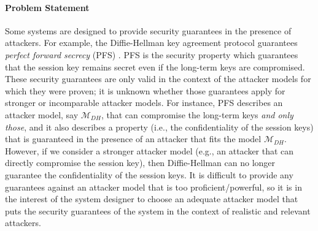     



\label{sec:Classification:ClassificationProblem}
\paragraph{Problem Statement}
Some systems are designed to provide security guarantees in the presence of attackers. For example, the Diffie-Hellman key agreement protocol guarantees \emph{perfect forward secrecy} (PFS) \cite{Gunther1990,Menezes1996}. PFS is the security property which guarantees that the session key remains secret even if the long-term keys are compromised. These security guarantees are only valid in the context of the attacker models for which they were proven; it is unknown whether those guarantees apply for stronger or incomparable attacker models. For instance, PFS describes an attacker model, say $\mathcal{M}_{DH}$, that can compromise the long-term keys \emph{and only those}, and it also describes a property (i.e., the confidentiality of the session keys) that is guaranteed in the presence of an attacker that fits the model $\mathcal{M}_{DH}$. However, if we consider a stronger attacker model (e.g., an attacker that can directly compromise the session key), then Diffie-Hellman can no longer guarantee the confidentiality of the session keys. It is difficult to provide any guarantees against an attacker model that is too proficient/powerful, so it is in the interest of the system designer to choose an adequate attacker model that puts the security guarantees of the system in the context of realistic and relevant attackers. 
 
